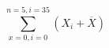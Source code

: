 \documentclass{article}
\begin{document}
\begin{huge}

\[  \sum_{x=0,i=0}^{n=5,i=35} (X_i+\overline{X})  \]

\end{huge}
\end{document}
